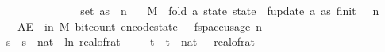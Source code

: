 \begin{isabellebody}
\ \ \ {\isachardoublequoteopen}{\isasymepsilon}\ {\isasymin}\ {\isacharbraceleft}{\kern0pt}{}{\isacharless}{\kern0pt}{\isachardot}{\kern0pt}{\isachardot}{\kern0pt}{\isacharless}{\kern0pt}{}{\isacharbraceright}{\kern0pt}{\isachardoublequoteclose}\isanewline
\ \ \ {\isachardoublequoteopen}{\isasymdelta}\ {\isasymin}\ {\isacharbraceleft}{\kern0pt}{}{\isacharless}{\kern0pt}{\isachardot}{\kern0pt}{\isachardot}{\kern0pt}{\isacharless}{\kern0pt}{}{\isacharbraceright}{\kern0pt}{\isachardoublequoteclose}\isanewline
\ \ \ {\isachardoublequoteopen}set\ as\ {\isasymsubseteq}\ {\isacharbraceleft}{\kern0pt}{}{\isachardot}{\kern0pt}{\isachardot}{\kern0pt}{\isacharless}{\kern0pt}n{\isacharbraceright}{\kern0pt}{\isachardoublequoteclose}\isanewline
\ \ \ {\isachardoublequoteopen}M\ {\isasymequiv}\ fold\ {\isacharparenleft}{\kern0pt}{\isasymlambda}a\ state{\isachardot}{\kern0pt}\ state\ {\isasymbind}\ f{}{\isacharunderscore}{\kern0pt}update\ a{\isacharparenright}{\kern0pt}\ as\ {\isacharparenleft}{\kern0pt}f{}{\isacharunderscore}{\kern0pt}init\ {\isasymdelta}\ {\isasymepsilon}\ n{\isacharparenright}{\kern0pt}{\isachardoublequoteclose}\isanewline
\ \ \ {\isachardoublequoteopen}AE\ {\isasymomega}\ in\ M{\isachardot}{\kern0pt}\ bit{\isacharunderscore}{\kern0pt}count\ {\isacharparenleft}{\kern0pt}encode{\isacharunderscore}{\kern0pt}state\ {\isasymomega}{\isacharparenright}{\kern0pt}\ {\isasymle}\ f{}{\isacharunderscore}{\kern0pt}space{\isacharunderscore}{\kern0pt}usage\ {\isacharparenleft}{\kern0pt}n{\isacharcomma}{\kern0pt}\ {\isasymepsilon}{\isacharcomma}{\kern0pt}\ {\isasymdelta}{\isacharparenright}{\kern0pt}{\isachardoublequoteclose}\isanewline
%
\isadelimproof
%
\endisadelimproof
%
\isatagproof
{}\isamarkupfalse%
\ {\isacharminus}{\kern0pt}\isanewline
\ \ \isamarkupfalse%
\ s\ \ {\isachardoublequoteopen}s\ {\isacharequal}{\kern0pt}\ nat\ {\isasymlceil}{\isacharminus}{\kern0pt}{\isacharparenleft}{\kern0pt}{}{}{\isacharasterisk}{\kern0pt}\ ln\ {\isacharparenleft}{\kern0pt}real{\isacharunderscore}{\kern0pt}of{\isacharunderscore}{\kern0pt}rat\ {\isasymepsilon}{\isacharparenright}{\kern0pt}{\isacharparenright}{\kern0pt}{\isasymrceil}{\isachardoublequoteclose}\isanewline
\ \ \isamarkupfalse%
\ t\ \ {\isachardoublequoteopen}t\ {\isacharequal}{\kern0pt}\ nat\ {\isasymlceil}{}{}\ {\isacharslash}{\kern0pt}\ {\isacharparenleft}{\kern0pt}real{\isacharunderscore}{\kern0pt}of{\isacharunderscore}{\kern0pt}rat\ {\isasymdelta}{\isacharparenright}{\kern0pt}\isanewline

\end{isabellebody}
